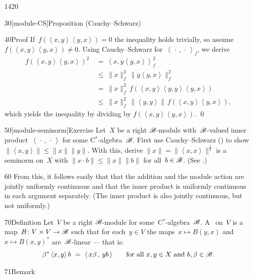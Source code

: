 \begin{parsec}{1420}
\begin{point}{30}[module-CS]{Proposition (Cauchy--Schwarz)}
\begin{point}{40}{Proof}
If~$f(\left<x,y\right>\left<y,x\right>) = 0$
the inequality holds trivially,
so assume~$f(\left<x,y\right>\left<y,x\right>) \neq 0$.
Using Cauchy--Schwarz for~$\left<\,\cdot\,,\,\cdot\,\right>_f$,
    we derive
\begin{align*}
    f(\left<x,y\right>\left<y,x\right>)^2
        &\  =\  \left<x,y\left<y,x\right>\right>_f^2 \\
        &\  \leq\  \|x\|_f^2 \, \|y \left<y,x\right>\|_f^2 \\
    & \ =\  \|x\|_f^2\, f(\left<x,y\right>\left<y,y\right>\left<y,x\right>)\\
    & \ \leq\  \|x\|_f^2 \,
    \|\left<y,y\right>\| \,
    f(\left<x,y\right>\left<y,x\right>),
\end{align*}
    which yields the inequality by dividing by
$f(\left<x,y\right>\left<y,x\right>)$. \qed
\end{point}
\end{point}
\begin{point}{50}[module-seminorm]{Exercise}
Let~$X$ be a right $\mathscr{B}$-module
    with~$\mathscr{B}$-valued inner product~$\left<\,\cdot\,,\,\cdot\,\right>$
    for some C$^*$-algebra~$\mathscr{B}$.
First use Cauchy--Schwarz ()
    to show~$\|\left<x,y\right>\| \leq \|x\|\|y\|$.
With this, derive $\|x\| =\|\left<x,x\right>\|^{\frac{1}{2}}$ is a seminorm on~$X$ with
    $\|x \cdot b \| \leq \|x\|\|b\|$
    for all~$b \in \mathscr{B}$.
    (See \cite[prop.~2.3]{paschke}.)
\begin{point}{60}%
From this, it follows easily that
that the addition and the module action
are jointly uniformly continuous
    and that the inner product is uniformly continuous in each argument
    separately.
(The inner product is also jointly continuous,
    but not uniformly.)
\end{point}
\end{point}
\begin{point}{70}{Definition}%
Let~$V$ be a right $\mathscr{B}$-module for some~C$^*$-algebra~$\mathscr{B}$.
A~ on~$V$
    is a map~$B\colon V\times V \to \mathscr{B}$
    such that for each~$y\in V$
    the maps~$x \mapsto B(y, x)$
        and~$x \mapsto B(x,y)^*$ are~$\mathscr{B}$-linear --- that is:
\begin{equation*}
\beta^* \,\langle x,y\rangle \,b \ =\ \langle \,x \beta\,,\, y b \,\rangle 
    \qquad \text{for all $x,y \in X$ and~$b,\beta \in \mathscr{B}$}.
\end{equation*}
\spacingfix{}
\begin{point}{71}{Remark}%

\end{point}
\end{point}
\end{parsec}
